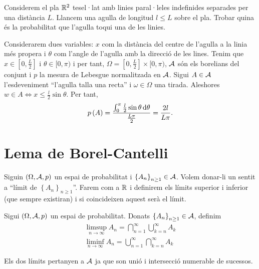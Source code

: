 \begin{problema}
  Considerem el pla $\mathbb{R}^2$ tesel·lat amb linies paral·leles indefinides separades per una distància $L$. Llancem una agulla de longitud $l\leq L$ sobre el pla.
  Trobar quina és la probabilitat que l'agulla toqui una de les linies.
\end{problema}
\begin{sol}
  Considerarem dues variables: $x$ com la distància del centre de l'agulla a la linia més propera i $\theta$ com l'angle de l'agulla amb la direcció de les lines.
  Tenim que $x\in\left[0,\frac{L}{2}\right]$ i $\theta\in[0,\pi)$ i per tant, $\Omega =\left[0,\frac{L}{2}\right]\times[0,\pi)$, $\mathcal{A}$ són els borelians 
  del conjunt i $p$ la mesura de Lebesgue normalitzada en $\mathcal{A}$. Sigui $A\in\mathcal{A}$ l'esdeveniment ``l'agulla talla una recta'' i $\omega\in\Omega$ una tirada.
  Aleshores $w\in A \iff x\leq \frac{l}{2}\sin\theta$. Per tant,
  \[
   p\lp A\rp = \frac{\int_0^{\pi}\frac{l}{2}\sin\theta \dif\theta}{\frac{L\pi}{2}}=\frac{2l}{L\pi}.
  \]
\end{sol}

\section{Lema de Borel-Cantelli}
Siguin $\left(\Omega,\mathcal{A} ,p\right)$ un espai de probabilitat i $\left\{ A_n\right\}_{n\geq1} \in \mathcal{A}$. Volem donar-li 
un sentit a ``límit de $\left\{ A_n\right\}_{n\geq1}$''. Farem com a $\mathbb{R}$ i definirem els límits superior i inferior 
(que sempre existiran) i si coincideixen aquest serà el límit.

\begin{defi}
  Sigui $\left(\Omega,\mathcal{A},p\right)$ un espai de probabilitat. Donats $\left\{ A_n\right\}_{n\geq1} \in \mathcal{A}$, definim
  \begin{gather*}
    \limsup_{n\to\infty} A_n = \bigcap_{n=1}^{\infty}\bigcup_{k=n}^{\infty} A_k \\
    \liminf_{n\to\infty} A_n = \bigcup_{n=1}^{\infty}\bigcap_{k=n}^{\infty} A_k
  \end{gather*}
\end{defi}

\begin{obs}
  Els dos límits pertanyen a $\mathcal{A}$ ja que son unió i intersecció numerable de sucessos.
\end{obs}

